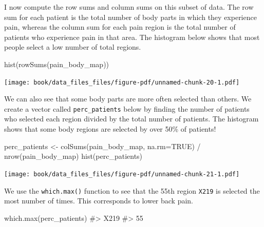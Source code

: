 \documentclass[
  letterpaper,
]{krantz}
\makeatletter
\newenvironment{Shaded}{\begin{snugshade}}{\end{snugshade}}
\newcommand{\AttributeTok}[1]{\textcolor[rgb]{0.40,0.45,0.13}{#1}}
\newcommand{\CommentTok}[1]{\textcolor[rgb]{0.37,0.37,0.37}{#1}}
\newcommand{\ConstantTok}[1]{\textcolor[rgb]{0.56,0.35,0.01}{#1}}
\newcommand{\FunctionTok}[1]{\textcolor[rgb]{0.28,0.35,0.67}{#1}}
\newcommand{\NormalTok}[1]{\textcolor[rgb]{0.00,0.23,0.31}{#1}}
\newcommand{\OtherTok}[1]{\textcolor[rgb]{0.00,0.23,0.31}{#1}}
\newcommand{\SpecialCharTok}[1]{\textcolor[rgb]{0.37,0.37,0.37}{#1}}
\newenvironment{kframe}{%
\medskip{}
\setlength{\fboxsep}{.8em}
 \def\at@end@of@kframe{}%
 \ifinner\ifhmode%
  \def\at@end@of@kframe{\end{minipage}}%
  \begin{minipage}{\columnwidth}%
 \fi\fi%
 \def\FrameCommand##1{\hskip\@totalleftmargin \hskip-\fboxsep
 \colorbox{shadecolor}{##1}\hskip-\fboxsep
     \hskip-\linewidth \hskip-\@totalleftmargin \hskip\columnwidth}%
 \MakeFramed {\advance\hsize-\width
   \@totalleftmargin\z@ \linewidth\hsize
   \@setminipage}}%
 {\par\unskip\endMakeFramed%
 \at@end@of@kframe}
\renewenvironment{Shaded}{\begin{kframe}}{\end{kframe}}
\makeatother
\begin{document}
I now compute the row sums and column sums on this subset of data. The
row sum for each patient is the total number of body parts in which they
experience pain, whereas the column sum for each pain region is the
total number of patients who experience pain in that area. The histogram
below shows that most people select a low number of total regions.

\begin{Shaded}
\begin{Highlighting}[]
\FunctionTok{hist}\NormalTok{(}\FunctionTok{rowSums}\NormalTok{(pain\_body\_map))}
\end{Highlighting}
\end{Shaded}

\begin{center}
\texttt{[image: book/data\_files\_files/figure-pdf/unnamed-chunk-20-1.pdf]}
\end{center}

We can also see that some body parts are more often selected than
others. We create a vector called \texttt{perc\_patients} below by
finding the number of patients who selected each region divided by the
total number of patients. The histogram shows that some body regions are
selected by over 50\% of patients!

\begin{Shaded}
\begin{Highlighting}[]
\NormalTok{perc\_patients }\OtherTok{\textless{}{-}} \FunctionTok{colSums}\NormalTok{(pain\_body\_map, }\AttributeTok{na.rm=}\ConstantTok{TRUE}\NormalTok{) }\SpecialCharTok{/}
  \FunctionTok{nrow}\NormalTok{(pain\_body\_map)}
\FunctionTok{hist}\NormalTok{(perc\_patients)}
\end{Highlighting}
\end{Shaded}

\begin{center}
\texttt{[image: book/data\_files\_files/figure-pdf/unnamed-chunk-21-1.pdf]}
\end{center}

We use the \texttt{which.max()} function to see that the 55th region
\texttt{X219} is selected the most number of times. This corresponds to
lower back pain.

\begin{Shaded}
\begin{Highlighting}[]
\FunctionTok{which.max}\NormalTok{(perc\_patients)}
\CommentTok{\#\textgreater{} X219 }
\CommentTok{\#\textgreater{}   55}
\end{Highlighting}
\end{Shaded}
\end{document}
